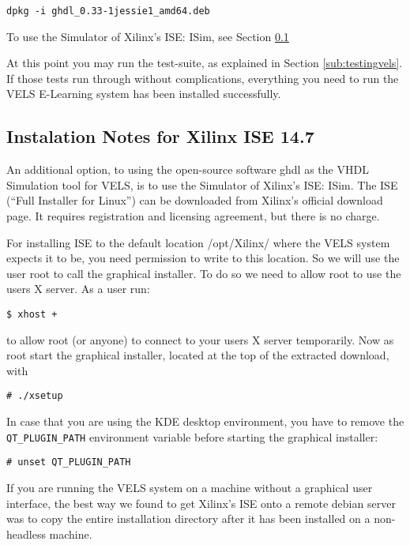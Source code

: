 \begin{verbatim}
dpkg -i ghdl_0.33-1jessie1_amd64.deb
\end{verbatim}

To use the Simulator of Xilinx's ISE: ISim, see Section \ref{ISE-install}

At this point you may run the test-suite, as explained in Section \ref{sub:testingvels}.
If those tests run through without complications, everything you need to run the VELS
E-Learning system has been installed successfully.

\subsection{Instalation Notes for Xilinx ISE 14.7}\label{ISE-install}

An additional option, to using the open-source software ghdl as the VHDL Simulation tool for VELS, is to use the Simulator of Xilinx's ISE: ISim. The ISE (``Full Installer for Linux'') can be downloaded from Xilinx's official download page. It requires registration and licensing agreement, but there is no charge.

For installing ISE to the default location /opt/Xilinx/ where the VELS system expects it to be, you need permission to write to this location. So we will use the user root to call the graphical installer. To do so we need to allow root to use the users X server. As a user run:

\begin{verbatim}
$ xhost +
\end{verbatim}

to allow root (or anyone) to connect to your users X server temporarily. Now as root start the graphical installer, located at the top of the extracted download, with

\begin{verbatim}
# ./xsetup
\end{verbatim}

In case that you are using the KDE desktop environment, you have to remove the \verb!QT_PLUGIN_PATH! environment variable before starting the graphical installer:

\begin{verbatim}
# unset QT_PLUGIN_PATH
\end{verbatim}

If you are running the VELS system on a machine without a graphical user interface, the best way we found to get Xilinx's ISE onto a remote debian server was to copy the entire installation directory after it has been installed on a non-headless machine.
